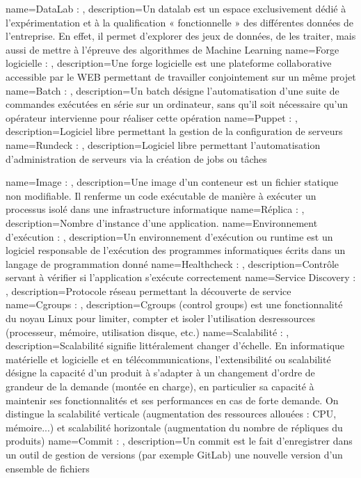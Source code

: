 {
    name=DataLab : ,
    description={Un datalab est un espace exclusivement dédié à l’expérimentation et à la qualification « fonctionnelle » des différentes données de l’entreprise. En effet, il permet d’explorer des jeux de données, de les traiter, mais aussi de mettre à l’épreuve des algorithmes de Machine Learning}
}
{
    name=Forge logicielle : ,
    description={Une forge logicielle est une plateforme collaborative accessible par le WEB permettant de travailler conjointement sur un même projet}
}
{
    name=Batch : ,
    description={Un batch désigne l’automatisation d’une suite de commandes exécutées en série sur un ordinateur, sans qu’il soit nécessaire qu’un opérateur intervienne pour réaliser cette opération}
}
{
    name=Puppet : ,
    description={Logiciel libre permettant la gestion de la configuration de serveurs}
}
{
    name=Rundeck : ,
    description={Logiciel libre permettant l’automatisation d’administration de serveurs via la création de jobs ou tâches}
}

{
    name=Image : ,
    description={Une image d'un conteneur est un fichier statique non modifiable. Il renferme un code exécutable de manière à exécuter un processus isolé dans une infrastructure informatique}
}
{
    name=Réplica : ,
    description={Nombre d’instance d’une application.}
}
{
    name=Environnement d'exécution : ,
    description={Un environnement d’exécution ou runtime est un logiciel responsable de l’exécution des programmes informatiques écrits dans un langage de programmation donné}
}
{
    name=Healthcheck : ,
    description={Contrôle servant à vérifier si l’application s’exécute correctement}
}
{
    name=Service Discovery : ,
    description={Protocole réseau permettant la découverte de service}
}
{
    name=Cgroups : ,
    description={Cgroups (control groups) est une fonctionnalité du noyau Linux pour limiter, compter et isoler l’utilisation desressources (processeur, mémoire, utilisation disque, etc.)}
}
{
    name=Scalabilité : ,
    description={Scalabilité signifie littéralement changer d'échelle. En informatique matérielle et logicielle et en télécommunications, l’extensibilité ou scalabilité désigne la capacité d'un produit à s'adapter à un changement d'ordre de grandeur de la demande (montée en charge), en particulier sa capacité à maintenir ses fonctionnalités et ses performances en cas de forte demande. On distingue la scalabilité verticale (augmentation des ressources allouées :  CPU, mémoire...) et scalabilité horizontale (augmentation du nombre de répliques du produits)}
}
{
    name=Commit : ,
    description={Un commit est le fait d’enregistrer dans un outil de gestion de versions (par exemple GitLab) une nouvelle version d’un ensemble de fichiers}
}

